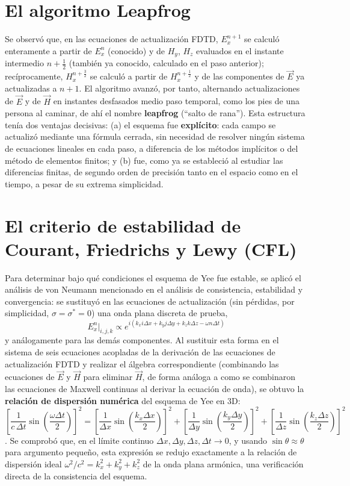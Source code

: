 \section{El algoritmo Leapfrog}
Se observó que, en las ecuaciones de actualización FDTD, $E_x^{n+1}$ se calculó enteramente a partir de $E_x^n$ (conocido) y de $H_y$, $H_z$ evaluados en el instante intermedio $n+\frac{1}{2}$ (también ya conocido, calculado en el paso anterior); recíprocamente, $H_x^{n+\frac{3}{2}}$ se calculó a partir de $H_x^{n+\frac{1}{2}}$ y de las componentes de $\vec{E}$ ya actualizadas a $n+1$. El algoritmo avanzó, por tanto, alternando actualizaciones de $\vec{E}$ y de $\vec{H}$ en instantes desfasados medio paso temporal, como los pies de una persona al caminar, de ahí el nombre \textbf{leapfrog} (``salto de rana''). Esta estructura tenía dos ventajas decisivas: (a) el esquema fue \textbf{explícito}: cada campo se actualizó mediante una fórmula cerrada, sin necesidad de resolver ningún sistema de ecuaciones lineales en cada paso, a diferencia de los métodos implícitos o del método de elementos finitos; y (b) fue, como ya se estableció al estudiar las diferencias finitas, de segundo orden de precisión tanto en el espacio como en el tiempo, a pesar de su extrema simplicidad.

\section{El criterio de estabilidad de Courant, Friedrichs y Lewy (CFL)}
Para determinar bajo qué condiciones el esquema de Yee fue estable, se aplicó el análisis de von Neumann mencionado en el análisis de consistencia, estabilidad y convergencia: se sustituyó en las ecuaciones de actualización (sin pérdidas, por simplicidad, $\sigma=\sigma^*=0$) una onda plana discreta de prueba,
\begin{equation}
    E_x^n\big|_{i, j, k} \propto e^{i(k_x i\Delta x + k_y j\Delta y + k_z k\Delta z - \omega n\Delta t)}
\end{equation}
y análogamente para las demás componentes. Al sustituir esta forma en el sistema de seis ecuaciones acopladas de la derivación de las ecuaciones de actualización FDTD y realizar el álgebra correspondiente (combinando las ecuaciones de $\vec{E}$ y $\vec{H}$ para eliminar $\vec{H}$, de forma análoga a como se combinaron las ecuaciones de Maxwell continuas al derivar la ecuación de onda), se obtuvo la \textbf{relación de dispersión numérica} del esquema de Yee en 3D:
\begin{equation}
    \boxed{\left[\frac{1}{c\, \Delta t}\sin\left(\frac{\omega\Delta t}{2}\right)\right]^2 = \left[\frac{1}{\Delta x}\sin\left(\frac{k_x\Delta x}{2}\right)\right]^2 + \left[\frac{1}{\Delta y}\sin\left(\frac{k_y\Delta y}{2}\right)\right]^2 + \left[\frac{1}{\Delta z}\sin\left(\frac{k_z\Delta z}{2}\right)\right]^2}
\end{equation}
\cite{Taflove2005, Schneider2025}. Se comprobó que, en el límite continuo $\Delta x, \Delta y, \Delta z, \Delta t\to0$, y usando $\sin\theta\approx\theta$ para argumento pequeño, esta expresión se redujo exactamente a la relación de dispersión ideal $\omega^2/c^2=k_x^2+k_y^2+k_z^2$ de la onda plana armónica, una verificación directa de la consistencia del esquema.

